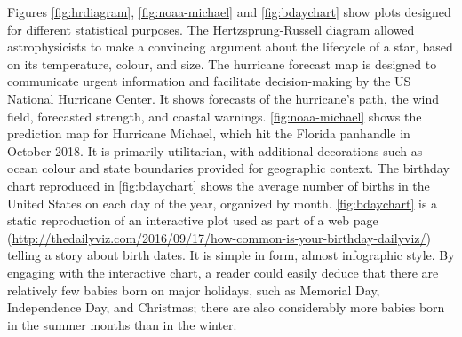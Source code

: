 \documentclass[letterpaper]{ar-1col}\usepackage[]{graphicx}\usepackage[]{color}
\newcommand{\todo}[1]{\textcolor{pink}{#1}}
\begin{document}
Figures \ref{fig:hrdiagram}, \ref{fig:noaa-michael} and \ref{fig:bdaychart} show plots designed for different statistical purposes. The Hertzsprung-Russell diagram allowed astrophysicists to make a convincing argument about the lifecycle of a star, based on its temperature, colour, and size. The hurricane forecast map is designed to communicate urgent information and facilitate decision-making by the US National Hurricane Center. It shows forecasts of the hurricane's path, the wind field, forecasted strength, and coastal warnings. \autoref{fig:noaa-michael} shows the prediction map for Hurricane Michael, which hit the Florida panhandle in October 2018. It is primarily utilitarian, with additional decorations such as ocean colour and state boundaries provided for geographic context. The birthday chart reproduced in \autoref{fig:bdaychart} shows the average number of births in the United States on each day of the year, organized by month. \autoref{fig:bdaychart} is a static reproduction of an  interactive plot used as part of a web page (\url{http://thedailyviz.com/2016/09/17/how-common-is-your-birthday-dailyviz/}) telling a story about birth dates. It is simple in form, almost infographic style. By engaging with the interactive chart, a reader could easily deduce that there are relatively few babies born on major holidays, such as Memorial Day, Independence Day, and Christmas; there are also considerably more babies born in the summer months than in the winter.




\end{document}
